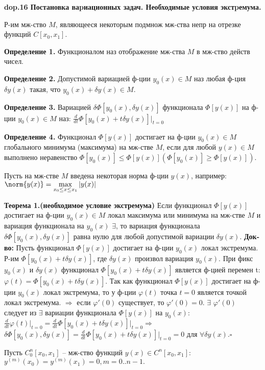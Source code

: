 
\textbf{\LARGE dop.16 Постановка ваpиационных задач. Необходимые условия экстpемума.}

Р-им мж-ство $M$, являющееся некоторым подмнож
мж-ства непр на отрезке функций $C[x_0, x_1]$.


\textbf{Определение 1.}
Функционалом наз отображение мж-ства $M$ в мж-ство действ чисел.

\textbf{Определение 2.}
Допустимой вариацией ф-ции $y_0(x) \in M$ наз любая ф-ция $\delta y(x)$ такая, что $y_0(x) + \delta y(x) \in M$.

\textbf{Определение 3.}
Вариацией $\delta\Phi[y_0(x), \delta y(x)]$ функционала
$\Phi[y(x)]$ на ф-ции $y_0(x) \in M$ наз: $\frac{d}{dt}\Phi[y_0(x)+t\delta y(x)]\Big|_{t=0}$

\textbf{Определение 4.}
Функционал $\Phi[y(x)]$ достигает на ф-ции
$y_0(x) \in M$ глобального минимума (максимума) на мж-стве $M$, если для любой $y(x) \in M$ выполнено неравенство $\Phi[y_0(x)]\leq\Phi[y(x)]  (\Phi[y_0(x)]\geq\Phi[y(x)])$.


Пусть на мж-стве $M$ введена некоторая норма ф-ции $y(x)$, например:
$\norm{y(x)}=\displaystyle\max_{x_0\leq x \leq x_1} |y(x)|$


\textbf{Теорема 1.(необходимое условие экстремума)}
    Если функционал $\Phi[y(x)]$ достигает на ф-ции
    $y_0(x) \in M$ локал максимума или минимума на мж-стве $M$ и
    вариация функционала на $y_0(x)$ $\exists$, то вариация функционала $\delta\Phi[y_0(x), \delta y(x)]$ равна нулю для любой допустимой вариации $\delta y(x)$.
\textbf{Док-во:}
    Пусть функционал $\Phi[y(x)]$ достигает на ф-ции
    $y_0(x)$ локал экстремума. Р-им $\Phi[y_0(x) + t\delta y(x)]$, где $\delta y(x)$
    произвол вариация $y_0(x)$. При фикс $y_0(x)$ и $\delta y(x)$ функционал 
    $\Phi[y_0(x) + t\delta y(x)]$ является ф-цией перемен t:
    $\varphi(t) = \Phi[y_0(x) + t\delta y(x)].$
    Так как функционал $\Phi[y(x)]$ достигает на ф-ции $y_0(x)$ локал
    экстремума, то у ф-ции $\varphi(t)$ точка $t=0$ является точкой локал экстремума. $\Longrightarrow$ если $\varphi'(0)$ существует, то
    $\varphi'(0)=0$. $\exists$ $\varphi'(0)$ следует из $\exists$ вариации функционала $\Phi[y(x)]$ на $y_0(x)$: $\frac{d}{dt}\varphi(t)\Big|_{t=0}=\frac{d}{dt}\Phi[y_0(x)+t\delta y(x)]\Big|_{t=0} \Longrightarrow$
    $\delta \Phi[y_0(x), \delta y(x)]=\frac{d}{dt}\Phi[y_0(x)+t\delta y(x)]\Big|_{t=0}=0 \text{ для } \forall \delta y(x)$.$\square$


Пусть $C^n_0 [x_0, x_1]$ -- мж-ство функций $y(x) \in C^n[x_0, x_1]:$ $y^{(m)}(x_0)=y^{(m)}(x_1)=0, m=0..n-1.$

